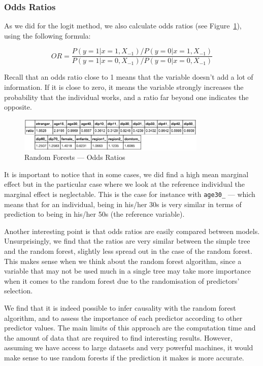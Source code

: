 \subsubsection{Odds Ratios}
As we did for the logit method, we also calculate odds ratios (see Figure~\ref{fig:random_forest_odds_ratios}), using the following formula:

\begin{equation}
    OR = \frac{P(y=1|x=1, X_{-1})/P(y=0|x=1, X_{-1})}{P(y=1|x=0, X_{-1})/P(y=0|x=0, X_{-1})}
\end{equation}

Recall that an odds ratio close to 1 means that the variable doesn’t add a lot of information. If it is close to zero, it means the variable strongly increases the probability that the individual works, and a ratio far beyond one indicates the opposite.

\begin{figure}
    \centering
    \includegraphics[width=0.8\textwidth]{img/random_forest_odds_ratios.png}
    \caption{Random Forests --- Odds Ratios}
    \label{fig:random_forest_odds_ratios}
\end{figure}

It is important to notice that in some cases, we did find a high mean marginal effect but in the particular case where we look at the reference individual the marginal effect is neglectable. This is the case for instance with \texttt{age30\_} --- which means that for an individual, being in his/her 30s is very similar in terms of prediction to being in his/her 50s (the reference variable).

Another interesting point is that odds ratios are easily compared between models. Unsurprisingly, we find that the ratios are very similar between the simple tree and the random forest, slightly less spread out in the case of the random forest. This makes sense when we think about the random forest algorithm, since a variable that may not be used much in a single tree may take more importance when it comes to the random forest due to the randomisation of predictors' selection.

We find that it is indeed possible to infer causality with the random forest algorithm, and to assess the importance of each predictor according to other predictor values. The main limits of this approach are the computation time and the amount of data that are required to find interesting results. However, assuming we have access to large datasets and very powerful machines, it would make sense to use random forests if the prediction it makes is more accurate.

